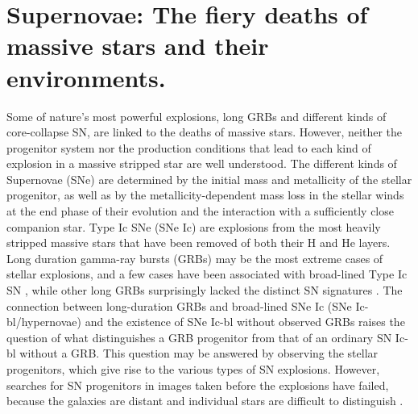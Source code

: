 \section{Supernovae: The fiery deaths of massive stars and their environments.}
\label{sec:intro:sn}

Some of nature's most powerful explosions, long
  GRBs and different kinds of core-collapse SN, are linked to the
  deaths of massive stars. However, neither the progenitor system nor
  the production conditions that lead to each kind of explosion in a
  massive stripped star are well understood. The different kinds of
  Supernovae (SNe) are determined by the initial mass and metallicity
  of the stellar progenitor, as well as by the metallicity-dependent
  mass loss in the stellar winds at the end phase of their evolution
  and the interaction with a sufficiently close companion star. Type
  Ic SNe (SNe Ic) are explosions from the most heavily stripped
  massive stars that have been removed of both their H and He
  layers. Long duration gamma-ray bursts (GRBs) may be the most
  extreme cases of stellar explosions, and a few cases have been
  associated with broad-lined Type Ic SN \citep{Woosley2006}, while other long GRBs
  surprisingly lacked the distinct SN signatures \citep{Fynbo2006}. The connection
  between long-duration GRBs and broad-lined SNe Ic (SNe
  Ic-bl/hypernovae) and the existence of SNe Ic-bl without observed
  GRBs raises the question of what distinguishes a GRB progenitor from
  that of an ordinary SN Ic-bl without a GRB. This question may be
  answered by observing the stellar progenitors, which give rise to
  the various types of SN explosions. However, searches for SN
  progenitors in images taken before the explosions have failed,
  because the galaxies are distant and individual stars are difficult
  to distinguish \citep{Maund2005}.

